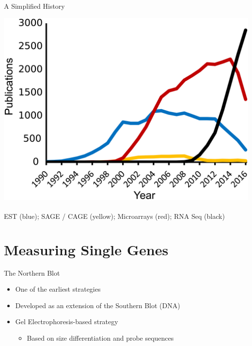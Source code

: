 \documentclass[aspectratio=169,11pt]{beamer}
\begin{document}
\begin{frame}{A Simplified History}

	\begin{center}
	\includegraphics[scale=0.5]{figures/timeTrends.png}		
	~\\
	\textcolor[rgb]{0.1,0.4,0.7}{EST (blue)};
	\textcolor[rgb]{0.85,0.65,0.15}{SAGE / CAGE (yellow)};
	\textcolor[rgb]{0.7,0,0.2}{Microarrays (red)};  
	RNA Seq (black) 
	\end{center}
 

\end{frame}

\section{Measuring Single Genes}


\begin{frame}{The Northern Blot}

	\begin{itemize}
		\item One of the earliest strategies
		\item Developed as an extension of the Southern Blot (DNA)
		\item Gel Electrophoresis-based strategy
		\begin{itemize}
			\item Based on size differentiation and probe sequences
		\end{itemize}
	\end{itemize}

\end{frame}
\end{document}
